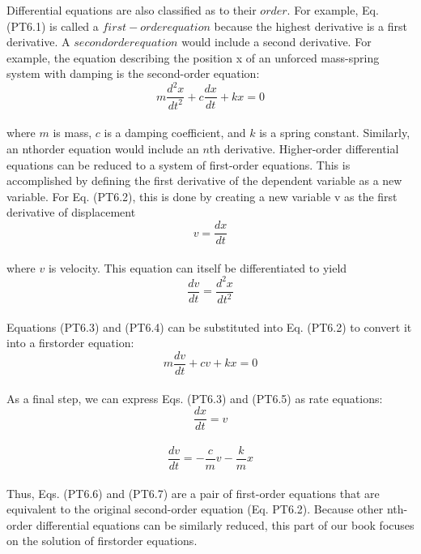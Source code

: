 \documentclass[../main.tex]{subfiles}
\begin{document}
Differential equations are also classified as to their $order$. For example, Eq. (PT6.1) is
called a $first-order equation$ because the highest derivative is a first derivative. A $secondorder equation$ would include a second derivative. For example, the equation describing the
position x of an unforced mass-spring system with damping is the second-order equation:
\begin{equation}
\tag{PT6.2}
m\dfrac{d^{2}x}{dt^{2}} + c\dfrac{dx}{dt} + kx = 0
\end{equation}\\
where $m$ is mass, $c$ is a damping coefficient, and $k$ is a spring constant. Similarly, an nthorder equation would include an $n$th derivative.
Higher-order differential equations can be reduced to a system of first-order equations.
This is accomplished by defining the first derivative of the dependent variable as a new
variable. For Eq. (PT6.2), this is done by creating a new variable v as the first derivative of
displacement
\begin{equation}
\tag{PT6.3}
v=\dfrac{dx}{dt}
\end{equation}\\
where $v$ is velocity. This equation can itself be differentiated to yield
\begin{equation}
\tag{PT6.4}
\dfrac{dv}{dt} = \dfrac{d^{2}x}{dt^{2}}
\end{equation}\\
Equations (PT6.3) and (PT6.4) can be substituted into Eq. (PT6.2) to convert it into a firstorder equation:\\
\begin{equation}
\tag{PT6.5}
m\dfrac{dv}{dt} + cv + kx = 0
\end{equation}\\
As a final step, we can express Eqs. (PT6.3) and (PT6.5) as rate equations:\\
\begin{equation}
\tag{PT6.6}
\dfrac{dx}{dt} = v
\end{equation}\\
\begin{equation}
\tag{PT6.7}
\dfrac{dv}{dt} = -\dfrac{c}{m}v - \dfrac{k}{m} x
\end{equation}\\
Thus, Eqs. (PT6.6) and (PT6.7) are a pair of first-order equations that are equivalent
to the original second-order equation (Eq. PT6.2). Because other nth-order differential
equations can be similarly reduced, this part of our book focuses on the solution of firstorder equations.
\end{document}
